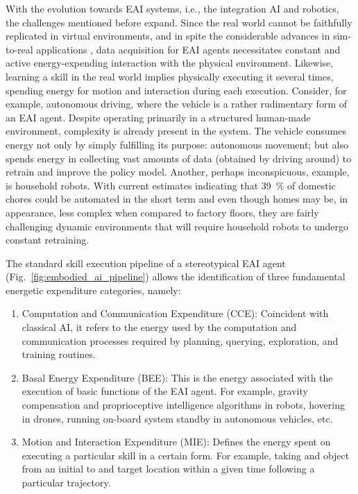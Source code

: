 \documentclass[12pt]{article}
\begin{document}
With the evolution towards EAI systems, i.e., the integration AI and robotics, the challenges mentioned before expand. Since the real world cannot be faithfully replicated in virtual environments, and in spite the considerable advances in sim-to-real applications \cite{Chebotar2019Closingsimreal}, data acquisition for EAI agents necessitates constant and active energy-expending interaction with the physical environment. Likewise, learning a skill in the real world implies physically executing it several times, spending energy for motion and interaction during each execution. Consider, for example, autonomous driving, where the vehicle is a rather rudimentary form of an EAI agent. Despite operating primarily in a structured human-made environment, complexity is already present in the system. The vehicle consumes energy not only by simply fulfilling its purpose: autonomous movement; but also spends energy in collecting vast amounts of data (obtained by driving around) to retrain and improve the policy model. Another, perhaps inconspicuous, example, is household robots. With current estimates indicating that 39~\%  of domestic chores could be automated in the short term \cite{Lehdonvirta2022futuresunpaidwork} and even though homes may be, in appearance, less complex when compared to factory floors, they are fairly challenging dynamic environments that will require household robots to undergo constant retraining. 

The standard skill execution pipeline of a stereotypical EAI agent (Fig.~\ref{fig:embodied_ai_pipeline}) allows the identification of three fundamental energetic expenditure categories, namely:
\begin{enumerate}
	\item Computation and Communication Expenditure (CCE): Coincident with classical AI, it refers to the energy used by the computation and communication processes required by planning, querying, exploration, and training routines.
	\item Basal Energy Expenditure (BEE): This is the energy associated with the execution of basic functions of the EAI agent. For example, gravity compensation and proprioceptive intelligence algorithms in robots, hovering in drones, running on-board system standby in autonomous vehicles, etc.
	\item Motion and Interaction Expenditure (MIE): Defines the energy spent on executing a particular skill in a certain form. For example, taking and object from an initial to and target location within a given time following a particular trajectory.
\end{enumerate}
\end{document}
